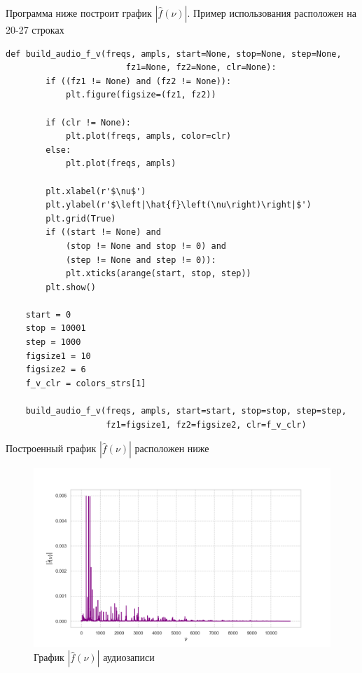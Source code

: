 \documentclass[a4paper, 16pt]{article}
\begin{document}
    \noindent Программа ниже построит график $|\hat{f}(\nu)|$. Пример использования расположен на 20-27 строках
    \begin{lstlisting}[label=f_v_mp3, caption=Программа для построения графика $|\hat{f}(\nu)|$ аудиозаписи]
    def build_audio_f_v(freqs, ampls, start=None, stop=None, step=None,
                        fz1=None, fz2=None, clr=None):
        if ((fz1 != None) and (fz2 != None)):
            plt.figure(figsize=(fz1, fz2))

        if (clr != None):
            plt.plot(freqs, ampls, color=clr)
        else:
            plt.plot(freqs, ampls)

        plt.xlabel(r'$\nu$')
        plt.ylabel(r'$\left|\hat{f}\left(\nu\right)\right|$')
        plt.grid(True)
        if ((start != None) and
            (stop != None and stop != 0) and
            (step != None and step != 0)):
            plt.xticks(arange(start, stop, step))
        plt.show()

    start = 0
    stop = 10001
    step = 1000
    figsize1 = 10
    figsize2 = 6
    f_v_clr = colors_strs[1]

    build_audio_f_v(freqs, ampls, start=start, stop=stop, step=step,
                    fz1=figsize1, fz2=figsize2, clr=f_v_clr)
    \end{lstlisting}


    \noindent Построенный график $|\hat{f}(\nu)|$ расположен ниже
    \begin{figure}[!htb]
        \centering
        \includegraphics[scale=0.5]{f_v.png}
        \captionsetup{skip=0pt}
        \caption{График $|\hat{f}(\nu)|$ аудиозаписи}
        \label{Рис:16}
    \end{figure}
\end{document}
